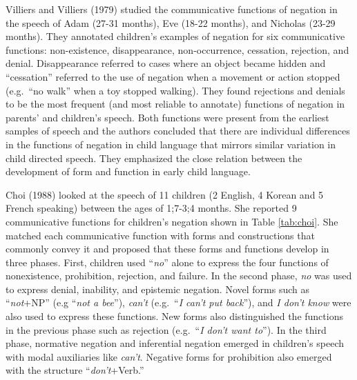 \documentclass[
  english,
  man,floatsintext]{apa6}
\begin{document}
Villiers and Villiers (1979) studied the communicative functions of negation in the speech of Adam (27-31 months), Eve (18-22 months), and Nicholas (23-29 months). They annotated children's examples of negation for six communicative functions: non-existence, disappearance, non-occurrence, cessation, rejection, and denial. Disappearance referred to cases where an object became hidden and ``cessation'' referred to the use of negation when a movement or action stopped (e.g.~``no walk'' when a toy stopped walking). They found rejections and denials to be the most frequent (and most reliable to annotate) functions of negation in parents' and children's speech. Both functions were present from the earliest samples of speech and the authors concluded that there are individual differences in the functions of negation in child language that mirrors similar variation in child directed speech. They emphasized the close relation between the development of form and function in early child language.

Choi (1988) looked at the speech of 11 children (2 English, 4 Korean and 5 French speaking) between the ages of 1;7-3;4 months. She reported 9 communicative functions for children's negation shown in Table \ref{tab:choi}. She matched each communicative function with forms and constructions that commonly convey it and proposed that these forms and functions develop in three phases. First, children used ``\emph{no}'' alone to express the four functions of nonexistence, prohibition, rejection, and failure. In the second phase, \emph{no} was used to express denial, inability, and epistemic negation. Novel forms such as ``\emph{not}+NP'' (e.g ``\emph{not a bee}''), \emph{can't} (e.g.~``\emph{I can't put back}''), and \emph{I don't know} were also used to express these functions. New forms also distinguished the functions in the previous phase such as rejection (e.g.~``\emph{I don't want to}''). In the third phase, normative negation and inferential negation emerged in children's speech with modal auxiliaries like \emph{can't}. Negative forms for prohibition also emerged with the structure ``\emph{don't}+Verb.''
\end{document}

